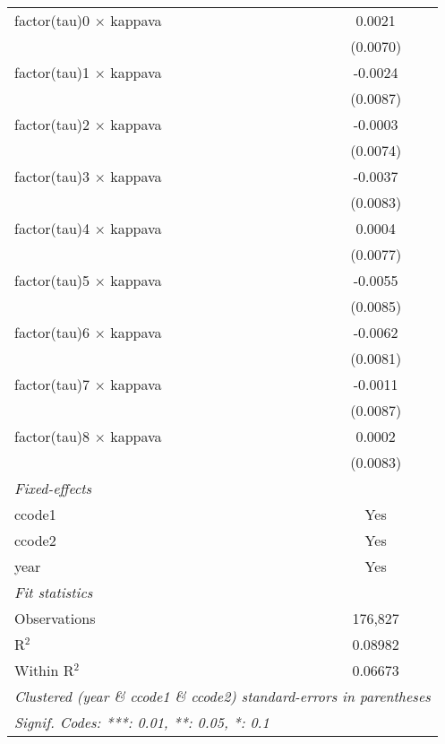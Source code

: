\begin{tabular}{lc}
   factor(tau)0 $\times$ kappava   & 0.0021\\   
                                   & (0.0070)\\   
   factor(tau)1 $\times$ kappava   & -0.0024\\   
                                   & (0.0087)\\   
   factor(tau)2 $\times$ kappava   & -0.0003\\   
                                   & (0.0074)\\   
   factor(tau)3 $\times$ kappava   & -0.0037\\   
                                   & (0.0083)\\   
   factor(tau)4 $\times$ kappava   & 0.0004\\   
                                   & (0.0077)\\   
   factor(tau)5 $\times$ kappava   & -0.0055\\   
                                   & (0.0085)\\   
   factor(tau)6 $\times$ kappava   & -0.0062\\   
                                   & (0.0081)\\   
   factor(tau)7 $\times$ kappava   & -0.0011\\   
                                   & (0.0087)\\   
   factor(tau)8 $\times$ kappava   & 0.0002\\   
                                   & (0.0083)\\   
   \midrule
   \emph{Fixed-effects}\\
   ccode1                          & Yes\\  
   ccode2                          & Yes\\  
   year                            & Yes\\  
   \midrule
   \emph{Fit statistics}\\
   Observations                    & 176,827\\  
   R$^2$                           & 0.08982\\  
   Within R$^2$                    & 0.06673\\  
   \midrule \midrule
   \multicolumn{2}{l}{\emph{Clustered (year \& ccode1 \& ccode2) standard-errors in parentheses}}\\
   \multicolumn{2}{l}{\emph{Signif. Codes: ***: 0.01, **: 0.05, *: 0.1}}\\
\end{tabular}
\par\endgroup



